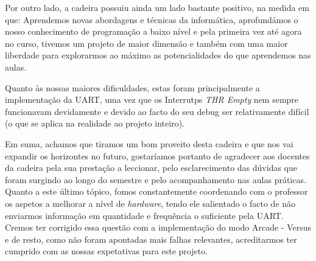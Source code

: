 \documentclass{report}
\begin{document}
Por outro lado, a cadeira possuiu ainda um lado bastante positivo, na medida em que: Aprendemos novas abordagens e técnicas da informática, aprofundámos o nosso conhecimento de programação a baixo nível e pela primeira vez até agora no curso, tivemos um projeto de maior dimensão e também com uma maior liberdade para explorarmos ao máximo as potencialidades do que aprendemos nas aulas.

Quanto às nossas maiores dificuldades, estas foram principalmente a implementação da UART, uma vez que os Interrutps \textit{THR Empty} nem sempre funcionavam devidamente e devido ao facto do seu debug ser relativamente difícil (o que se aplica na realidade ao projeto inteiro).

Em suma, achamos que tiramos um bom proveito desta cadeira e que nos vai expandir os horizontes no futuro, gostaríamos portanto de agradecer aos docentes da cadeira pela sua prestação a leccionar, pelo esclarecimento das dúvidas que foram surgindo ao longo do semestre e pelo acompanhamento nas aulas práticas. Quanto a este último tópico, fomos constantemente coordenando com o professor os aspetos a melhorar a nível de \textit{hardware}, tendo ele salientado o facto de não enviarmos informação em quantidade e frequência o suficiente pela UART. Cremos ter corrigido essa questão com a implementação do modo Arcade - Versus e de resto, como não foram apontadas mais falhas relevantes, acreditarmos ter cumprido com as nossas expetativas para este projeto.

\paragraph{}
\end{document}
